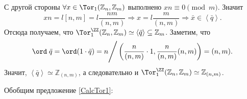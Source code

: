 \begin{Proof}
        С другой стороны $\forall x \in \Tor_1(\mathbb{Z}_n, \mathbb{Z}_m)$ выполнено $xn \equiv 0 \pmod{m}$. Значит 
        $$
            xn = l[n, m] = l\frac{nm}{(n, m)} \Rightarrow x = l\frac{m}{(n, m)} \Rightarrow \bar x \in \left<\bar q\right>.
        $$
        Отсюда получаем, что $\Tor_1^\ZZ(\mathbb{Z}_n, \mathbb{Z}_m) \simeq \left< \bar{q} \right> \subseteq \mathbb{Z}_m$.
        Заметим, что 
        \begin{equation*}
            \ord\; \bar q = \ord(1 \cdot \bar q) = n \Bigg / \left( \frac{n}{(n, m)} \cdot 1, \frac{n}{(n, m)}(n, m) \right) = (n, m).
        \end{equation*}
        Значит, $\left<\bar q \right> \simeq \mathbb{Z}_{(n, m)}$, а следовательно и $\Tor_1^\ZZ(\mathbb{Z}_n, \mathbb{Z}_m) \simeq \mathbb{Z}_{(n, m)}$.
    \end{Proof}

    Обобщим предложение \ref{CalcTor1}:

